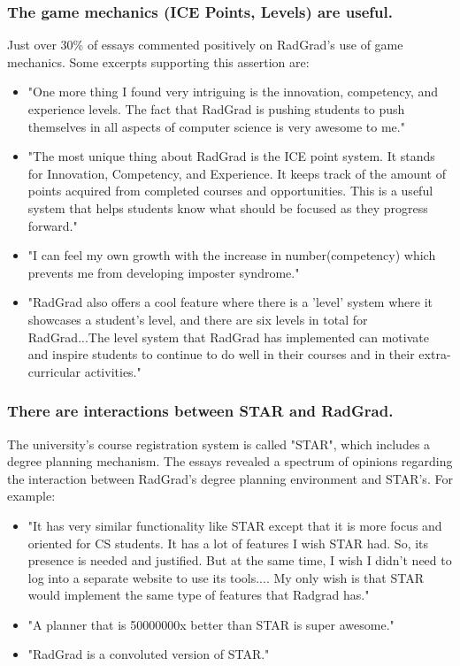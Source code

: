 \documentclass[acmsmall,nonacm]{acmart}
\begin{document}
\subsubsection{The game mechanics (ICE Points, Levels) are useful.} Just over 30\% of essays commented positively on RadGrad's use of game mechanics.  Some excerpts supporting this assertion are:
\begin{itemize}[leftmargin=*]
\item "One more thing I found very intriguing is the innovation, competency, and experience levels. The fact that RadGrad is pushing students to push themselves in all aspects of computer science is very awesome to me."
\item "The most unique thing about RadGrad is the ICE point system. It stands for Innovation, Competency, and Experience. It keeps track of the amount of points acquired from completed courses and opportunities. This is a useful system that helps students know what should be focused as they progress forward."
\item "I can feel my own growth with the increase in number(competency) which prevents me from developing imposter syndrome."
\item "RadGrad also offers a cool feature where there is a 'level' system where it showcases a student's level, and there are six levels in total for RadGrad...The level system that RadGrad has implemented can motivate and inspire students to continue to do well in their courses and in their extra-curricular activities."
\end{itemize}

\subsubsection{There are interactions between STAR and RadGrad.} The university's course registration system is called "STAR", which includes a degree planning mechanism. The essays revealed a spectrum of opinions regarding the interaction between RadGrad's degree planning environment and STAR's.  For example:
\begin{itemize}[leftmargin=*]
\item "It has very similar functionality like STAR except that it is more focus and oriented for CS students. It has a lot of features I wish STAR had. So, its presence is needed and justified. But at the same time, I wish I didn’t need to log into a separate website to use its tools.... My only wish is that STAR would implement the same type of features that Radgrad has."
\item "A planner that is 50000000x better than STAR is super awesome."
\item "RadGrad is a convoluted version of STAR."
\end{itemize}
\end{document}
